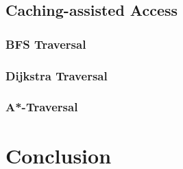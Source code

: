 \documentclass[a4paper,10pt]{article}
\begin{document}
\subsection{Caching-assisted Access}
 \subsubsection{BFS Traversal}

    \subsubsection{Dijkstra Traversal}

    \subsubsection{A*-Traversal}


\section{Conclusion}
\end{document}
